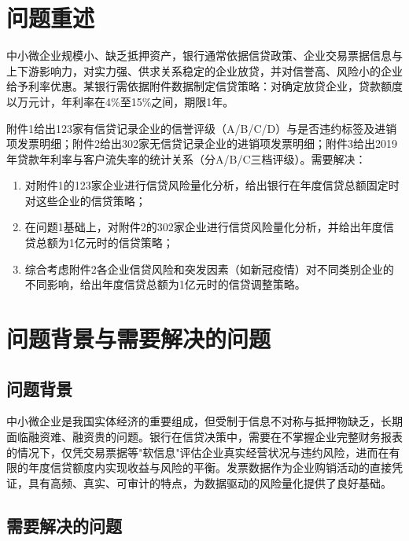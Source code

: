 \documentclass[12pt, a4paper]{article}
\begin{document}
\newpage

\section{问题重述}

中小微企业规模小、缺乏抵押资产，银行通常依据信贷政策、企业交易票据信息与上下游影响力，对实力强、供求关系稳定的企业放贷，并对信誉高、风险小的企业给予利率优惠。某银行需依据附件数据制定信贷策略：对确定放贷企业，贷款额度以万元计，年利率在4\%至15\%之间，期限1年。

附件1给出123家有信贷记录企业的信誉评级（A/B/C/D）与是否违约标签及进销项发票明细；附件2给出302家无信贷记录企业的进销项发票明细；附件3给出2019年贷款年利率与客户流失率的统计关系（分A/B/C三档评级）。需要解决：

\begin{enumerate}[label=\textbf{问题\arabic*：}, leftmargin=*]
    \item 对附件1的123家企业进行信贷风险量化分析，给出银行在年度信贷总额固定时对这些企业的信贷策略；
    \item 在问题1基础上，对附件2的302家企业进行信贷风险量化分析，并给出年度信贷总额为1亿元时的信贷策略；
    \item 综合考虑附件2各企业信贷风险和突发因素（如新冠疫情）对不同类别企业的不同影响，给出年度信贷总额为1亿元时的信贷调整策略。
\end{enumerate}

\section{问题背景与需要解决的问题}

\subsection{问题背景}

中小微企业是我国实体经济的重要组成，但受制于信息不对称与抵押物缺乏，长期面临融资难、融资贵的问题。银行在信贷决策中，需要在不掌握企业完整财务报表的情况下，仅凭交易票据等"软信息"评估企业真实经营状况与违约风险，进而在有限的年度信贷额度内实现收益与风险的平衡。发票数据作为企业购销活动的直接凭证，具有高频、真实、可审计的特点，为数据驱动的风险量化提供了良好基础。

\subsection{需要解决的问题}
\end{document}
